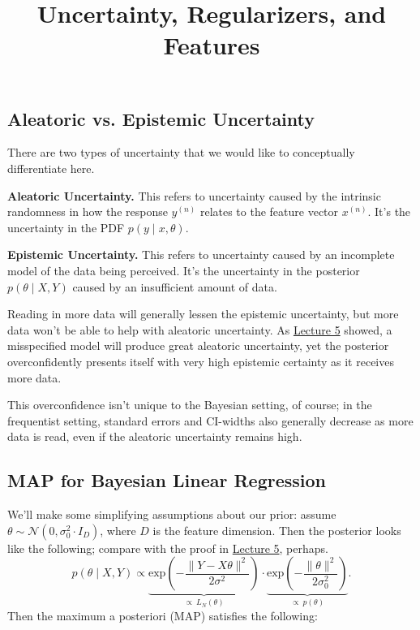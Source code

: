 \title{Uncertainty, Regularizers, and Features}



\subsection{Aleatoric vs. Epistemic Uncertainty}

There are two types of uncertainty
that we would like to conceptually differentiate here.

\textbf{Aleatoric Uncertainty.}
This refers to uncertainty caused by
the intrinsic randomness in how the response $y^{(n)}$
relates to the feature vector $x^{(n)}$.
It's the uncertainty in the PDF $p(y \mid x, \theta)$.

\textbf{Epistemic Uncertainty.}
This refers to uncertainty caused by
an incomplete model of the data being perceived.
It's the uncertainty in the posterior $p(\theta \mid X, Y)$
caused by an insufficient amount of data.

Reading in more data will generally lessen the
epistemic uncertainty, but more data won't be able to help
with aleatoric uncertainty. As
\href{/6.790/lectures/5/#bayesian-linear-regression-performance}{Lecture 5}
showed, a misspecified model will produce great aleatoric uncertainty,
yet the posterior overconfidently presents itself with
very high epistemic certainty as it receives more data.

\begin{remark}
    This overconfidence isn't unique to the Bayesian setting, of course;
    in the frequentist setting, standard errors and
    CI-widths also generally decrease as more data is read,
    even if the aleatoric uncertainty remains high.
\end{remark}

\subsection{MAP for Bayesian Linear Regression}

We'll make some simplifying assumptions about our prior:
assume $\theta \sim \mathcal{N}(0, \sigma_0^2 \cdot I_D)$,
where $D$ is the feature dimension.
Then the posterior looks like the following; compare with the proof in
\href{/6.790/lectures/5/#bayesian-linear-regression-theory}{Lecture 5},
perhaps.
\[ p(\theta \mid X, Y)
\propto \underbrace{\mathrm{exp}\left(
    -\frac{\|Y - X\theta\|^2}{2\sigma^2}
\right)}_{
    \propto ~ L_N(\theta)
} \cdot \underbrace{\mathrm{exp}\left(
    -\frac{\|\theta\|^2}{2\sigma_0^2}
\right)}_{\propto ~ p(\theta)}. \]
Then the maximum a posteriori (MAP)
satisfies the following:

